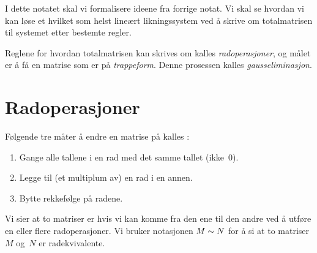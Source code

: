 
\usepackage{tikz}
\newcommand*\circled[1]{\tikz[baseline=(char.base)]{
            \node[shape=circle,draw,inner sep=2pt] (char) {#1};}}




\noindent%
I dette notatet skal vi formalisere ideene fra forrige notat.  Vi
skal se hvordan vi kan løse et hvilket som helst lineært
likningssystem ved å skrive om totalmatrisen til systemet etter
bestemte regler.

Reglene for hvordan totalmatrisen kan skrives om kalles
\emph{radoperasjoner}, og målet er å få en matrise som er på
\emph{trappeform}.  Denne prosessen kalles \emph{gausseliminasjon}.


\section*{Radoperasjoner}

Følgende tre måter å endre en matrise på kalles
:
\begin{enumerate}
\item Gange alle tallene i en rad med det samme tallet (ikke~$0$).
\item Legge til (et multiplum av) en rad i en annen.
\item Bytte rekkefølge på radene.
\end{enumerate}

Vi sier at to matriser er  hvis vi kan komme
fra den ene til den andre ved å utføre en eller flere radoperasjoner.
Vi bruker notasjonen $M \sim N$ for å si at to matriser $M$ og~$N$
er radekvivalente.

